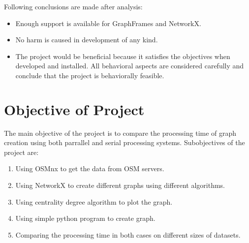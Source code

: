 Following conclusions are made after analysis:
\begin{itemize}
	\item Enough support is available for GraphFrames and NetworkX.
	\item No harm is caused in development of any kind.
	\item The project would be beneficial because it satisfies the objectives when developed and installed. All behavioral aspects are considered carefully and conclude that the project is behaviorally feasible.
\end{itemize}

\section{Objective of Project}
 	The main objective of the project is to compare the processing time of graph creation using both parrallel and serial processing systems. Subobjectives of the project are: 
\begin{enumerate}
\item Using OSMnx to get the data from OSM servers. 
\item Using NetworkX to create different graphs using different algorithms.
\item Using centrality degree algorithm to plot the graph.
\item Using simple python program to create graph.
\item Comparing the processing time in both cases on different sizes of datasets.
\end{enumerate}



